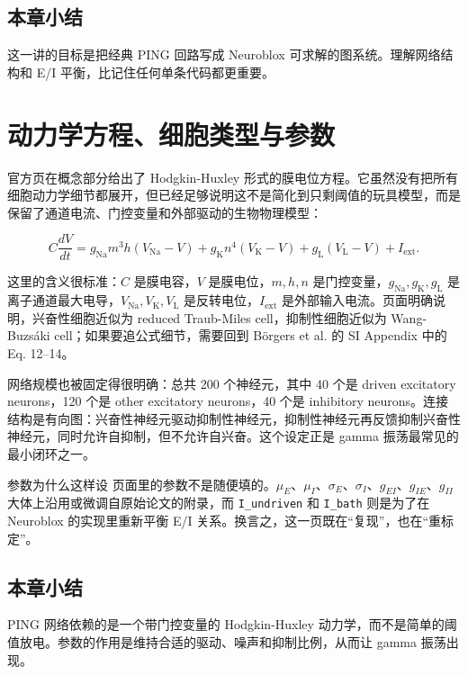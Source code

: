 \documentclass[a4paper]{article}
\begin{document}
\subsection{本章小结}
这一讲的目标是把经典 PING 回路写成 Neuroblox 可求解的图系统。理解网络结构和 E/I 平衡，比记住任何单条代码都更重要。

\section{动力学方程、细胞类型与参数}
官方页在概念部分给出了 Hodgkin-Huxley 形式的膜电位方程。它虽然没有把所有细胞动力学细节都展开，但已经足够说明这不是简化到只剩阈值的玩具模型，而是保留了通道电流、门控变量和外部驱动的生物物理模型：

\[
C \frac{dV}{dt}
=
g_{\mathrm{Na}} m^3 h \left(V_{\mathrm{Na}} - V\right)
+ g_{\mathrm{K}} n^4 \left(V_{\mathrm{K}} - V\right)
+ g_{\mathrm{L}} \left(V_{\mathrm{L}} - V\right)
+ I_{\mathrm{ext}}.
\]

这里的含义很标准：\(C\) 是膜电容，\(V\) 是膜电位，\(m,h,n\) 是门控变量，\(g_{\mathrm{Na}}, g_{\mathrm{K}}, g_{\mathrm{L}}\) 是离子通道最大电导，\(V_{\mathrm{Na}}, V_{\mathrm{K}}, V_{\mathrm{L}}\) 是反转电位，\(I_{\mathrm{ext}}\) 是外部输入电流。页面明确说明，兴奋性细胞近似为 reduced Traub-Miles cell，抑制性细胞近似为 Wang-Buzsáki cell；如果要追公式细节，需要回到 Börgers et al. 的 SI Appendix 中的 Eq. 12--14。

网络规模也被固定得很明确：总共 200 个神经元，其中 40 个是 driven excitatory neurons，120 个是 other excitatory neurons，40 个是 inhibitory neurons。连接结构是有向图：兴奋性神经元驱动抑制性神经元，抑制性神经元再反馈抑制兴奋性神经元，同时允许自抑制，但不允许自兴奋。这个设定正是 gamma 振荡最常见的最小闭环之一。

\begin{knowledgebox}{参数为什么这样设}
页面里的参数不是随便填的。\( \mu_E \)、\( \mu_I \)、\( \sigma_E \)、\( \sigma_I \)、\( g_{EI} \)、\( g_{IE} \)、\( g_{II} \) 大体上沿用或微调自原始论文的附录，而 \texttt{I\_undriven} 和 \texttt{I\_bath} 则是为了在 Neuroblox 的实现里重新平衡 E/I 关系。换言之，这一页既在“复现”，也在“重标定”。
\end{knowledgebox}

\subsection{本章小结}
PING 网络依赖的是一个带门控变量的 Hodgkin-Huxley 动力学，而不是简单的阈值放电。参数的作用是维持合适的驱动、噪声和抑制比例，从而让 gamma 振荡出现。
\end{document}
